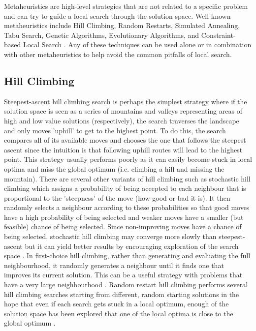 Metaheuristics are high-level strategies that are not related to a specific problem and can try to guide a local search through the solution space. Well-known metaheuristics include Hill Climbing, Random Restarts, Simulated Annealing, Tabu Search, Genetic Algorithms, Evolutionary Algorithms, and Constraint-based Local Search \citep{blum2003metaheuristics}. Any of these techniques can be used alone or in combination with other metaheuristics to help avoid the common pitfalls of local search.

\subsection{Hill Climbing}

Steepest-ascent hill climbing search \citep{russell2016artificial} is perhaps the simplest strategy where if the solution space is seen as a series of mountains and valleys representing areas of high and low value solutions (respectively), the search traverses the landscape and only moves 'uphill' to get to the highest point. To do this, the search compares all of its available moves and chooses the one that follows the steepest ascent since the intuition is that following uphill routes will lead to the highest point. This strategy usually performs poorly as it can easily become stuck in local optima and miss the global optimum (i.e. climbing a hill and missing the mountain). There are several other variants of hill climbing such as stochastic hill climbing which assigns a probability of being accepted to each neighbour that is proportional to the 'steepness' of the move (how good or bad it is). It then randomly selects a neighbour according to these probabilities so that good moves have a high probability of being selected and weaker moves have a smaller (but feasible) chance of being selected. Since non-improving moves have a chance of being selected, stochastic hill climbing may converge more slowly than steepest-ascent but it can yield better results by encouraging exploration of the search space \citep{russell2016artificial}. In first-choice hill climbing, rather than generating and evaluating the full neighbourhood, it randomly generates a neighbour until it finds one that improves its current solution. This can be a useful strategy with problems that have a very large neighbourhood \citep{russell2016artificial}. Random restart hill climbing performs several hill climbing searches starting from different, random starting solutions in the hope that even if each search gets stuck in a local optimum, enough of the solution space has been explored that one of the local optima is close to the global optimum \citep{russell2016artificial}.

